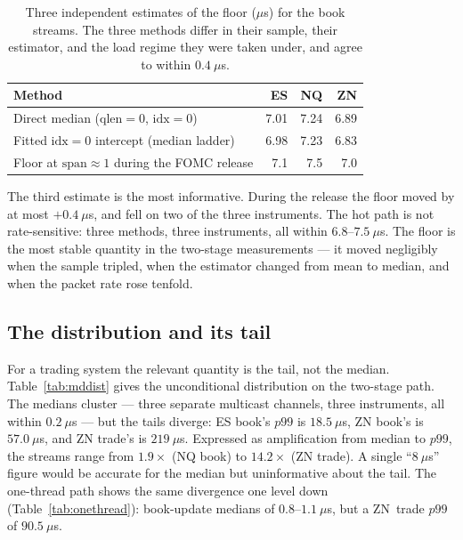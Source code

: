 \documentclass[11pt]{article}
\begin{document}
\begin{table}[!htb]
\centering
\caption{Three independent estimates of the floor ($\mu$s) for the book
streams. The three methods differ in their sample, their estimator, and the load regime
they were taken under, and agree to within $0.4~\mu$s.}
\label{tab:floor3}
\small
\begin{tabular}{lrrr}
\toprule
Method & ES & NQ & ZN \\
\midrule
Direct median ($\text{qlen}=0$, $\text{idx}=0$)        & 7.01 & 7.24 & 6.89 \\
Fitted $\text{idx}=0$ intercept (median ladder)        & 6.98 & 7.23 & 6.83 \\
Floor at $\text{span}\approx 1$ during the FOMC release & 7.1\phantom{0} & 7.5\phantom{0} & 7.0\phantom{0} \\
\bottomrule
\end{tabular}
\end{table}

The third estimate is the most informative. During the release the floor moved
by at most $+0.4~\mu$s, and fell on two of the three instruments. The hot path is
not rate-sensitive: three methods, three instruments, all within
$6.8$--$7.5~\mu$s. The floor is the most stable quantity in the two-stage
measurements --- it moved negligibly when the
sample tripled, when the estimator changed from mean to median, and when the
packet rate rose tenfold.

\subsection{The distribution and its tail}

For a trading system the relevant quantity is the tail, not the median.
Table~\ref{tab:mddist} gives the unconditional distribution on the two-stage
path. The medians cluster
--- three separate multicast channels, three instruments, all within $0.2~\mu$s
--- but the tails diverge: ES book's $p99$ is $18.5~\mu$s, ZN book's is
$57.0~\mu$s, and ZN trade's is $219~\mu$s. Expressed as amplification from median
to $p99$, the streams range from $1.9\times$ (NQ book) to $14.2\times$ (ZN
trade). A single ``$8~\mu$s'' figure would be accurate for the median but
uninformative about the tail. The one-thread path shows the same divergence one
level down (Table~\ref{tab:onethread}): book-update medians of
$0.8$--$1.1~\mu$s, but a ZN~trade $p99$ of $90.5~\mu$s.
\end{document}
